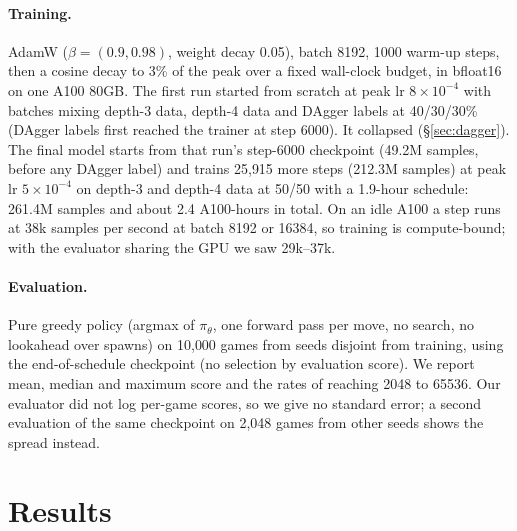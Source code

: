 \documentclass{article}
\begin{document}
\paragraph{Training.}
AdamW ($\beta=(0.9,0.98)$, weight decay 0.05), batch 8192, 1000 warm-up steps, then a cosine decay to 3\% of the peak over a fixed wall-clock budget, in bfloat16 on one A100 80GB.
The first run started from scratch at peak lr $8\times10^{-4}$ with batches mixing depth-3 data, depth-4 data and DAgger labels at 40/30/30\% (DAgger labels first reached the trainer at step 6000).
It collapsed (\S\ref{sec:dagger}).
The final model starts from that run's step-6000 checkpoint (49.2M samples, before any DAgger label) and trains 25{,}915 more steps (212.3M samples) at peak lr $5\times10^{-4}$ on depth-3 and depth-4 data at 50/50 with a 1.9-hour schedule: 261.4M samples and about 2.4 A100-hours in total.
On an idle A100 a step runs at 38k samples per second at batch 8192 or 16384, so training is compute-bound; with the evaluator sharing the GPU we saw 29k--37k.

\paragraph{Evaluation.}
Pure greedy policy (argmax of $\pi_\theta$, one forward pass per move, no search, no lookahead over spawns) on 10{,}000 games from seeds disjoint from training, using the end-of-schedule checkpoint (no selection by evaluation score).
We report mean, median and maximum score and the rates of reaching 2048 to 65536.
Our evaluator did not log per-game scores, so we give no standard error; a second evaluation of the same checkpoint on 2{,}048 games from other seeds shows the spread instead.

\section{Results}
\label{sec:results}
\end{document}
